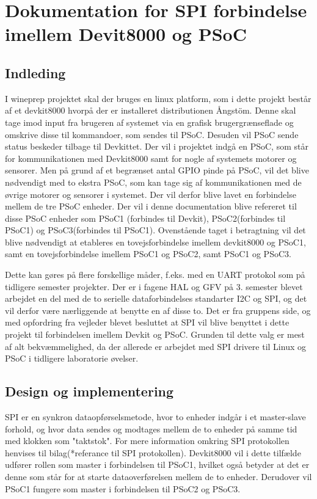 \chapter{Dokumentation for SPI forbindelse imellem Devit8000 og PSoC}

\section{Indleding}
I wineprep projektet skal der bruges en linux platform, som i dette projekt består af et devkit8000 hvorpå der er installeret distributionen Ångstöm. 
Denne skal tage imod input fra brugeren af systemet via en grafisk brugergrænseflade og omskrive disse til kommandoer, som sendes til PSoC. Desuden
vil PSoC sende status beskeder tilbage til Devkittet. 
Der vil i projektet indgå en PSoC, som står for kommunikationen med Devkit8000 samt for nogle af systemets motorer og sensorer.
Men på grund af et begrænset antal GPIO pinde på PSoC, vil det blive nødvendigt med to ekstra PSoC, som kan tage sig af kommunikationen med de 
øvrige motorer og sensorer i systemet. Der vil derfor blive lavet en forbindelse mellem de tre PSoC enheder. Der vil i denne documentation blive 
refereret til disse PSoC enheder som PSoC1 (forbindes til Devkit), PSoC2(forbindes til PSoC1) og PSoC3(forbindes til PSoC1). 
Ovenstående taget i betragtning vil det blive nødvendigt at etableres en tovejsforbindelse imellem devkit8000 og PSoC1, samt en tovejsforbindelse imellem 
PSoC1 og PSoC2, samt PSoC1 og PSoC3. 

Dette kan gøres på flere forskellige måder, f.eks. med en UART protokol som på tidligere semester projekter. Der er i fagene HAL og GFV på 3. semester 
blevet arbejdet en del med de to serielle dataforbindelses standarter I2C og SPI, og det vil derfor være nærliggende at benytte en af disse to. 
Det er fra gruppens side, og med opfordring fra vejleder blevet besluttet at SPI vil blive benyttet i dette projekt til forbindelsen imellem Devkit og 
PSoC. Grunden til dette valg er mest af alt bekvæmmelighed, da der allerede er arbejdet med SPI drivere til Linux og PSoC i tidligere laboratorie øvelser.   

\section{Design og implementering}
SPI er en synkron dataopførselsmetode, hvor to enheder indgår i et master-slave forhold, og hvor data sendes og modtages mellem de to enheder på
samme tid med klokken som "taktstok". For mere information omkring SPI protokollen henvises til bilag(*referance til SPI protokollen).
Devkit8000 vil i dette tilfælde udfører rollen som master i forbindelsen til PSoC1, hvilket også betyder at det er denne som står for at starte 
dataoverførelsen mellem de to enheder. Derudover vil PSoC1 fungere som master i forbindelsen til PSoC2 og PSoC3. 

